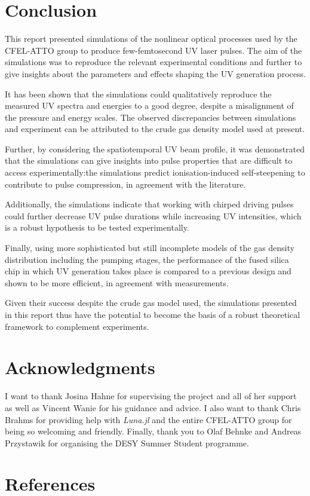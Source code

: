 \documentclass[a4paper]{jpconf}
\begin{document}
\section{Conclusion}
This report presented simulations of the nonlinear optical processes used by the CFEL-ATTO group to produce few-femtosecond UV laser pulses. The aim of the simulations was to reproduce the relevant experimental conditions and further to give insights about the parameters and effects shaping the UV generation process. \par 
It has been shown that the simulations could qualitatively reproduce the measured UV spectra and energies to a good degree, despite a misalignment of the pressure and energy scales. The observed discrepancies between simulations and experiment can be attributed to the crude gas density model used at present.  \par 
Further, by considering the spatiotemporal UV beam profile, it was demonstrated that the simulations can give insights into pulse properties that are difficult to access experimentally:the simulations predict ionisation-induced self-steepening to contribute to pulse compression, in agreement with the literature. \par 
Additionally, the simulations indicate that working with chirped driving pulses could further decrease UV pulse durations while increasing UV intensities, which is a robust hypothesis to be tested experimentally. \par 
Finally, using more sophisticated but still incomplete models of the gas density distribution including the pumping stages, the performance of the fused silica chip in which UV generation takes place is compared to a previous design and shown to be more efficient, in agreement with measurements. \par 
Given their success despite the crude gas model used, the simulations presented in this report thus have the potential to become the basis of a robust theoretical framework to complement experiments. 

\section*{Acknowledgments}
I want to thank Josina Hahne for supervising the project and all of her support as well as Vincent Wanie for his guidance and advice. I also want to thank Chris Brahms for providing help with \textit{Luna.jl} and the entire CFEL-ATTO group for being so welcoming and friendly. Finally, thank you to Olaf Behnke and Andreas Przystawik for organising the DESY Summer Student programme. 

\section*{References}


\end{document}

